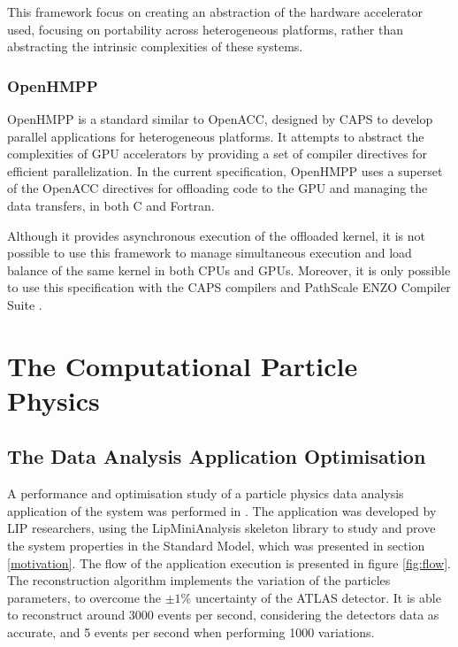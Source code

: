 This framework focus on creating an abstraction of the hardware accelerator used, focusing on portability across heterogeneous platforms, rather than abstracting the intrinsic complexities of these systems.

\subsubsection*{OpenHMPP}

OpenHMPP \cite{OpenHMPP} is a standard similar to OpenACC, designed by CAPS \cite{CAPS} to develop parallel applications for heterogeneous platforms. It attempts to abstract the complexities of GPU accelerators by providing a set of compiler directives for efficient parallelization. In the current specification, OpenHMPP uses a superset of the OpenACC directives for offloading code to the GPU and managing the data transfers, in both C and Fortran.

Although it provides asynchronous execution of the offloaded kernel, it is not possible to use this framework to manage simultaneous execution and load balance of the same kernel in both CPUs and GPUs. Moreover, it is only possible to use this specification with the CAPS compilers and PathScale ENZO Compiler Suite \cite{ENZO}.

\section{The Computational Particle Physics}
\label{particle_frameworks}

\subsection*{The \tth Data Analysis Application Optimisation}

A performance and optimisation study of a particle physics data analysis application of the \ttH system was performed in \cite{Msc:AMP,paperAMP}. The \tth application was developed by LIP researchers, using the LipMiniAnalysis skeleton library to study and prove the \ttH system properties in the Standard Model, which was presented in section \ref{motivation}. The flow of the application execution is presented in figure \ref{fig:flow}. The reconstruction algorithm implements the variation of the particles parameters, to overcome the $\pm1\%$ uncertainty of the ATLAS detector. It is able to reconstruct around 3000 events per second, considering the detectors data as accurate, and 5 events per second when performing 1000 variations.

